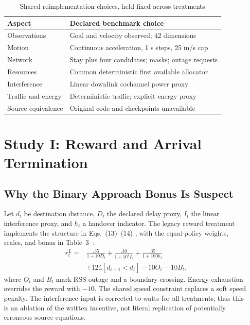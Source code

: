 \documentclass[conference]{IEEEtran}
\newcommand{\ind}{\mathbb{1}}
\begin{document}
\begin{table}[t]
\caption{Shared reimplementation choices, held fixed across treatments}
\label{tab:changes}\centering\footnotesize
\begin{tabular}{@{}p{}p{}@{}}
\toprule
Aspect & Declared benchmark choice\\\midrule
Observations & Goal and velocity observed; 42 dimensions\\
Motion & Continuous acceleration, 1 s steps, 25 m/s cap\\
Network & Stay plus four candidates; masks; outage requests\\
Resources & Common deterministic first available allocator\\
Interference & Linear downlink cochannel power proxy\\
Traffic and energy & Deterministic traffic; explicit energy proxy\\
Source equivalence & Original code and checkpoints unavailable\\\bottomrule
\end{tabular}
\end{table}

\section{Study I: Reward and Arrival Termination}
\label{sec:study1}
\subsection{Why the Binary Approach Bonus Is Suspect}
Let $d_t$ be destination distance, $D_t$ the declared delay proxy, $I_t$ the
linear interference proxy, and $h_t$ a handover indicator. The legacy reward
treatment implements the structure in Eqs.~(13)--(14)
\cite[p.~12]{thesis}, with the equal-policy weights, scales, and bonus in
Table~3~\cite[p.~15]{thesis}:
\begin{align}
r_t^L={}&\frac{.35}{1+10D_t}+\frac{.30}{1+10^5I_t}
       +\frac{.35}{1+100h_t} \nonumber\\
       &+12\ind[d_{t+1}<d_t]-10O_t-10B_t,
\end{align}
where $O_t$ and $B_t$ mark RSS outage and a boundary crossing. Energy exhaustion
overrides the reward with $-10$. The shared speed constraint replaces a soft
speed penalty. The interference input is corrected to watts for all treatments;
thus this is an ablation of the written incentive, not literal replication of
potentially erroneous source equations.
\end{document}
